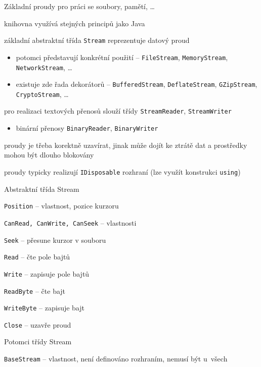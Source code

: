 \begin{frame}[fragile]
\vfill
\begin{bitemize}{Základní proudy pro práci se soubory, pamětí, \ldots}
\item knihovna využívá stejných principů jako Java
\item základní abstraktní třída \lstinline|Stream| reprezentuje datový proud
\begin{itemize}
\item potomci představují konkrétní použití -- \lstinline|FileStream|, \lstinline|MemoryStream|, \lstinline|NetworkStream|, \ldots
\item existuje zde řada dekorátorů -- \lstinline|BufferedStream|, \lstinline|DeflateStream|, \lstinline|GZipStream|, \lstinline|CryptoStream|, \ldots
\end{itemize}
\item pro realizaci textových přenosů slouží třídy \lstinline|StreamReader|, \lstinline|StreamWriter|
\begin{itemize}
\item binární přenosy \lstinline|BinaryReader|, \lstinline|BinaryWriter|
\end{itemize}
\end{bitemize}
\vfill
\begin{bitemize}{}
\item proudy je třeba korektně uzavírat, jinak může dojít ke ztrátě dat a prostředky mohou být dlouho blokovány
\item proudy typicky realizují \lstinline|IDisposable| rozhraní (lze využít konstrukci \lstinline|using|)
\end{bitemize}
\vfill
\end{frame}



\begin{frame}[fragile]
\vfill
\begin{bitemize}{Abstraktní třída Stream}
\item \lstinline|Position| -- vlastnost, pozice kurzoru
\item \lstinline|CanRead, CanWrite, CanSeek| -- vlastnosti
\item \lstinline|Seek| -- přesune kurzor v souboru
\item \lstinline|Read| -- čte pole bajtů
\item \lstinline|Write| -- zapisuje pole bajtů
\item \lstinline|ReadByte| -- čte bajt
\item \lstinline|WriteByte| -- zapisuje bajt
\item \lstinline|Close| -- uzavře proud
\end{bitemize}
\vfill
\begin{bitemize}{Potomci třídy Stream}
\item \lstinline|BaseStream| -- vlastnost, není definováno rozhraním, nemusí být u~všech
\end{bitemize}
\vfill
\end{frame}






